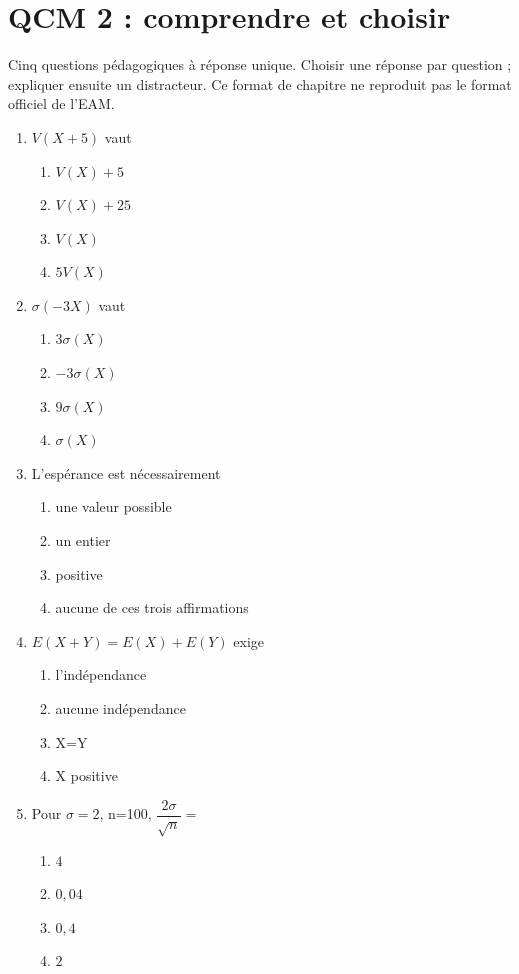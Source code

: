\endgroup
\begingroup\small
{}\section*{QCM 2 : comprendre et choisir}\label{C08-Q2}
Cinq questions pédagogiques à réponse unique. Choisir une réponse par question ; expliquer ensuite un distracteur. Ce format de chapitre ne reproduit pas le format officiel de l’EAM.
\begin{enumerate}
\item $V(X+5)$ vaut
\begin{enumerate}[label=\Alph*.,itemsep=2pt]
\item $V(X)+5$
\item $V(X)+25$
\item $V(X)$
\item $5V(X)$
\end{enumerate}
\item $\sigma(-3X)$ vaut
\begin{enumerate}[label=\Alph*.,itemsep=2pt]
\item $3\sigma(X)$
\item $-3\sigma(X)$
\item $9\sigma(X)$
\item $\sigma(X)$
\end{enumerate}
\item L’espérance est nécessairement
\begin{enumerate}[label=\Alph*.,itemsep=2pt]
\item une valeur possible
\item un entier
\item positive
\item aucune de ces trois affirmations
\end{enumerate}
\item $E(X+Y)=E(X)+E(Y)$ exige
\begin{enumerate}[label=\Alph*.,itemsep=2pt]
\item l’indépendance
\item aucune indépendance
\item X=Y
\item X positive
\end{enumerate}
\item Pour $\sigma=2$, n=100, $\dfrac{2\sigma}{\sqrt n}=$
\begin{enumerate}[label=\Alph*.,itemsep=2pt]
\item $4$
\item $0{,}04$
\item $0{,}4$
\item $2$
\end{enumerate}
\end{enumerate}

